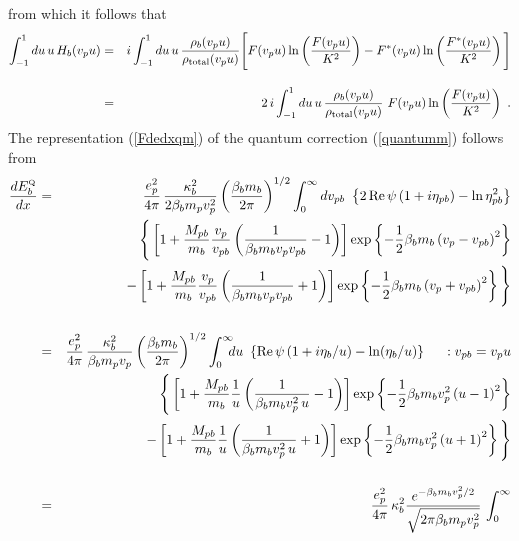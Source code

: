 \documentclass[preprint,12pt,eqsecnum,nofootinbib,amsmath,amssymb]{revtex4}
\newcommand{\smQ}{{\rm\scriptscriptstyle Q}}
\begin{document}
\noindent
from which it follows that 
\begin{eqnarray}
\nonumber
  \int_{-1}^1 du \, u \, H_b(v_p u) 
  &=&  
  i \int_{-1}^1 du \,u \, {\rho_b(v_p u) \over 
  \rho_{\rm total}(v_p u) } \Bigg[ F(v_p u ) \ln
  \left( { F(v_p u ) \over K^2 } \right) - F^*(v_p u)
  \ln \left( { F^*(v_p u) \over K^2 } \right) \Bigg] 
\\[10pt]
  &=&
  2\, i \int_{-1}^1 du \,u\, \frac{\rho_b(v_p u)}
  {\rho_{\rm total}(v_p u)}~ F(v_p u)
  \ln \left( \frac{ F(v_p u)}{K^2} \right) \ .
\end{eqnarray}
The representation (\ref{Fdedxqm}) of the quantum correction 
(\ref{quantumm}) follows from 
\begin{eqnarray}
  { d E^\smQ_b \over dx}  &=&
  { e_p^2 \over 4 \pi } \,
  { \kappa^2_b \over 2 \beta_b m_p v_p^2 }
  \left( { \beta_b m_b \over 2\pi } \right)^{1/2}
  \int_0^\infty dv_{pb} ~
  \left\{ 2\, {\rm Re} \, \psi \left( 1 + i \eta_{pb}
  \right) - \ln \eta^2_{pb}  \right\} 
\nonumber\\
  && \qquad
  \Bigg\{ \left[ 1 + {M_{pb} \over m_b} { v_p \over
  v_{pb} } \left( { 1 \over \beta_b m_b v_p v_{pb} } - 1
  \right) \right] \exp\left\{ - {1 
  \over 2} \beta_b m_b \left( v_p - v_{pb} \right)^2 
  \right\}
\nonumber\\
  && \qquad
  - \left[ 1 + {M_{pb} \over m_b} { v_p \over v_{pb} }
  \left( { 1 \over \beta_b m_b v_p v_{pb} } + 1 \right)
  \right]\exp\left\{- {1 \over 2} 
  \beta_b m_b \left( v_p +
  v_{pb} \right)^2\right\} \Bigg\} 
\\[15pt]
\nonumber
  &=&
  { e_p^2 \over 4 \pi } \,
  { \kappa^2_b \over \beta_b m_p v_p }
  \left( { \beta_b m_b \over 2\pi } \right)^{1/2}
  \int_0^\infty \hskip-0.2cm du ~
  \left\{ {\rm Re} \, \psi \left( 1 + i \eta_b/u
  \right) - \ln(\eta_b/u)  \right\} 
  \hskip0.5cm : v_{pb} = v_p u
\nonumber\\
  && \qquad
  \Bigg\{ \left[ 1 + {M_{pb} \over m_b} { 1 \over u } 
  \left( { 1 \over \beta_b m_b v_p^2\, u } - 1
  \right) \right] \exp\left\{ - {1 
  \over 2} \beta_b m_b v_p^2 \left( u-1 \right)^2 
  \right\}
\nonumber\\
  && \qquad
  - \left[ 1 + {M_{pb} \over m_b} { 1\over u }
  \left( { 1 \over \beta_b m_b v_p^2\,u } + 1 \right)
  \right]\exp\left\{- {1 \over 2} 
  \beta_b m_b v_p^2 \left(u + 1 \right)^2\right\} \Bigg\} 
\\[15pt]
  &=&
  { e_p^2 \over 4 \pi } \,
  \kappa^2_b  \frac{e^{-\beta_b m_b v_p^2/2} }
  {\sqrt{2\pi\beta_b m_p v_p^2} }\,\int_0^\infty 

\end{eqnarray}
\end{document}
